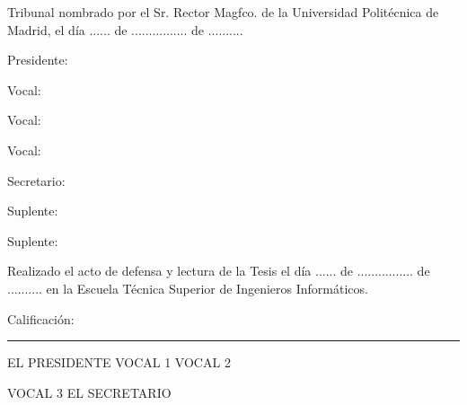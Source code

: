 \thispagestyle{empty}
\vspace*{8em}

Tribunal nombrado por el Sr. Rector Magfco. de la Universidad Politécnica de Madrid,
el día ...... de ................ de ..........
\newline\newline

Presidente:\newline

Vocal:\newline

Vocal:\newline

Vocal:\newline

Secretario:\newline

Suplente:\newline

Suplente:\newline\newline

Realizado el acto de defensa y lectura de la Tesis el día ...... de ................ de ..........
en la Escuela Técnica Superior de Ingenieros Informáticos.\newline\newline

Calificación: \rule{333 pt}{0.5 pt}\newline\newline\newline\newline

{\centering
  EL PRESIDENTE \hspace{30 mm} VOCAL 1 \hspace{30 mm} VOCAL 2\par
}
\vspace{35mm}
{\centering
  VOCAL 3  \hspace{40 mm} EL SECRETARIO\par
}

\newpage